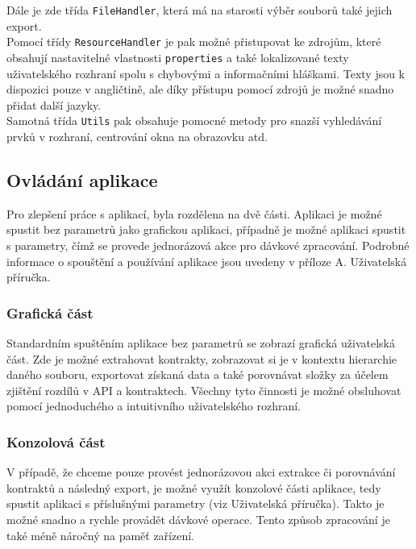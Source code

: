 				Dále je zde třída \texttt{FileHandler}, která má na starosti výběr souborů také jejich export.\\
				
				Pomocí třídy \texttt{ResourceHandler} je pak možné přistupovat ke zdrojům, které obsahují nastavitelné vlastnosti \texttt{properties} a také lokalizované texty uživatelského rozhraní spolu s chybovými a informačními hláškami. Texty jsou k dispozici pouze v angličtině, ale díky přístupu pomocí zdrojů je možné snadno přidat další jazyky.\\
				
				Samotná třída \texttt{Utils} pak obsahuje pomocné metody pro snazší vyhledávání prvků v rozhraní, centrování okna na obrazovku atd.		
		
	    	   
	   \subsection{Ovládání aplikace}
	   		Pro zlepšení práce s aplikací, byla rozdělena na dvě části. Aplikaci je možné spustit bez parametrů jako grafickou aplikaci, případně je možné aplikaci spustit s parametry, čímž se provede jednorázová akce pro dávkové zpracování. Podrobné informace o spouštění a používání aplikace jsou uvedeny v příloze A. Uživatelská příručka.
	   		
	   		\subsubsection{Grafická část}
	   			Standardním spuštěním aplikace bez parametrů se zobrazí grafická uživatelská část. Zde je možné extrahovat kontrakty, zobrazovat si je v kontextu hierarchie daného souboru, exportovat získaná data a také porovnávat složky za účelem zjištění rozdílů v API a kontraktech. Všechny tyto činnosti je možné obsluhovat pomocí jednoduchého a intuitivního uživatelského rozhraní.			   			  		
	   		\subsubsection{Konzolová část}
	   			V případě, že chceme pouze provést jednorázovou akci extrakce či porovnávání kontraktů a následný export, je možné využít konzolové části aplikace, tedy spustit aplikaci s příslušnými parametry (viz Uživatelská příručka). Takto je možné snadno a rychle provádět dávkové operace. Tento způsob zpracování je také méně náročný na paměť zařízení.
	   
